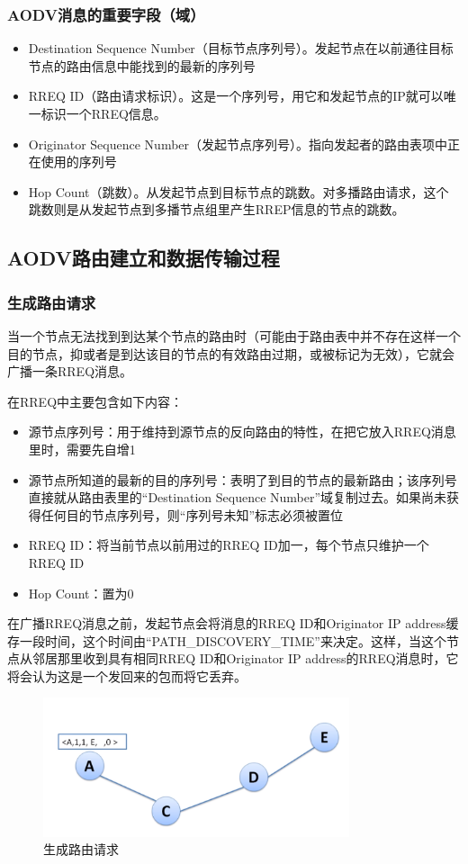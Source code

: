 \documentclass[12pt,a4paper]{article}
\begin{document}
\subsubsection{AODV消息的重要字段（域）}
\begin{itemize}
	\item Destination Sequence Number（目标节点序列号）。发起节点在以前通往目标节点的路由信息中能找到的最新的序列号
	\item RREQ ID（路由请求标识）。这是一个序列号，用它和发起节点的IP就可以唯一标识一个RREQ信息。
	\item Originator Sequence Number（发起节点序列号）。指向发起者的路由表项中正在使用的序列号
	\item Hop Count（跳数）。从发起节点到目标节点的跳数。对多播路由请求，这个跳数则是从发起节点到多播节点组里产生RREP信息的节点的跳数。
\end{itemize}

\subsection{AODV路由建立和数据传输过程}
\subsubsection{生成路由请求}
当一个节点无法找到到达某个节点的路由时（可能由于路由表中并不存在这样一个目的节点，抑或者是到达该目的节点的有效路由过期，或被标记为无效），它就会广播一条RREQ消息。

在RREQ中主要包含如下内容：

\begin{itemize}
	\item 源节点序列号：用于维持到源节点的反向路由的特性，在把它放入RREQ消息里时，需要先自增1
	\item 源节点所知道的最新的目的序列号：表明了到目的节点的最新路由；该序列号直接就从路由表里的“Destination Sequence Number”域复制过去。如果尚未获得任何目的节点序列号，则“序列号未知”标志必须被置位
	\item RREQ ID：将当前节点以前用过的RREQ ID加一，每个节点只维护一个RREQ ID
	\item Hop Count：置为0
\end{itemize}

在广播RREQ消息之前，发起节点会将消息的RREQ ID和Originator IP address缓存一段时间，这个时间由“PATH\_DISCOVERY\_TIME”来决定。这样，当这个节点从邻居那里收到具有相同RREQ ID和Originator IP address的RREQ消息时，它将会认为这是一个发回来的包而将它丢弃。

\begin{figure}[htb]
\centering
\includegraphics[width=9cm]{gen_route_request}
\caption{生成路由请求}
\end{figure}
\end{document}
